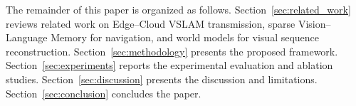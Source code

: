 The remainder of this paper is organized as follows. Section~\ref{sec:related_work} reviews related work on Edge--Cloud VSLAM transmission, sparse Vision--Language Memory for navigation, and world models for visual sequence reconstruction. Section~\ref{sec:methodology} presents the proposed \VLMemCodec{} framework. Section~\ref{sec:experiments} reports the experimental evaluation and ablation studies. Section~\ref{sec:discussion} presents the discussion and limitations. Section~\ref{sec:conclusion} concludes the paper.
